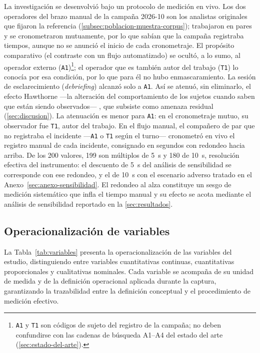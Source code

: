 La investigación se desenvolvió bajo un protocolo de medición en vivo. Los dos operadores del brazo manual de la campaña 2026-10 son los analistas originales que fijaron la referencia (\autoref{subsec:poblacion-muestra-corpus}); trabajaron en pares y se cronometraron mutuamente, por lo que sabían que la campaña registraba tiempos, aunque no se anunció el inicio de cada cronometraje. El propósito comparativo (el contraste con un flujo automatizado) se ocultó, a lo sumo, al operador externo (\texttt{A1})\footnote{\texttt{A1} y \texttt{T1} son códigos de sujeto del registro de la campaña; no deben confundirse con las cadenas de búsqueda A1--A4 del estado del arte (\autoref{sec:estado-del-arte}).}; el operador que es también autor del trabajo (\texttt{T1}) lo conocía por esa condición, por lo que para él no hubo enmascaramiento. La sesión de esclarecimiento (\emph{debriefing}) alcanzó solo a \texttt{A1}. Así se atenuó, sin eliminarlo, el efecto Hawthorne ---la alteración del comportamiento de los sujetos cuando saben que están siendo observados--- \parencite{McCambridge2014_hawthorne}, que subsiste como amenaza residual (\autoref{sec:discusion}). La atenuación es menor para \texttt{A1}: en el cronometraje mutuo, su observador fue \texttt{T1}, autor del trabajo. En el flujo manual, el compañero de par que no registraba el incidente ---\texttt{A1} o \texttt{T1} según el turno--- cronometró en vivo el registro manual de cada incidente, consignado en segundos con redondeo hacia arriba. De los 200 valores, 199 son múltiplos de 5~s y 180 de 10~s, resolución efectiva del instrumento: el descuento de 5~s del análisis de sensibilidad se corresponde con ese redondeo, y el de 10~s con el escenario adverso tratado en el Anexo~\ref{sec:anexo-sensibilidad}. El redondeo al alza constituye un sesgo de medición sistemático que infla el tiempo manual y su efecto se acota mediante el análisis de sensibilidad reportado en la \autoref{sec:resultados}.

\subsection{Operacionalización de variables}\label{subsec:operacionalizacion-variables}

La Tabla~\ref{tab:variables} presenta la operacionalización de las variables del estudio, distinguiendo entre variables cuantitativas continuas, cuantitativas proporcionales y cualitativas nominales. Cada variable se acompaña de su unidad de medida y de la definición operacional aplicada durante la captura, garantizando la trazabilidad entre la definición conceptual y el procedimiento de medición efectivo.

